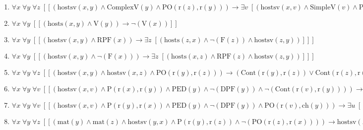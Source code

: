 \documentclass{article}
\begin{document}
\begin{enumerate}
\item $\forall x\; \forall y\; \forall z\;  \left[ \left[ \left(\textrm{hostsv}(x,y) \land \textrm{ComplexV}(y) \land \textrm{PO}(\textrm{r}(z),\textrm{r}(y))\right) \rightarrow \exists v\;  \left[ \left(\textrm{hostsv}(x,v) \land \textrm{SimpleV}(v) \land \textrm{PO}(\textrm{r}(z),\textrm{r}(v))\right) \right] \right] \right]$
\item $\forall x\; \forall y\;  \left[ \left[ \left(\textrm{hosts}(x,y) \land \textrm{V}(y)\right) \rightarrow \neg \left(\textrm{V}(x)\right) \right] \right]$
\item $\forall x\; \forall y\;  \left[ \left[ \left(\textrm{hostsv}(x,y) \land \textrm{RPF}(x)\right) \rightarrow \exists z\;  \left[ \left(\textrm{hosts}(z,x) \land \neg \left(\textrm{F}(z)\right) \land \textrm{hostsv}(z,y)\right) \right] \right] \right]$
\item $\forall x\; \forall y\;  \left[ \left[ \left(\textrm{hostsv}(x,y) \land \neg \left(\textrm{F}(x)\right)\right) \rightarrow \exists z\;  \left[ \left(\textrm{hosts}(x,z) \land \textrm{RPF}(z) \land \textrm{hostsv}(z,y)\right) \right] \right] \right]$
\item $\forall x\; \forall y\; \forall z\;  \left[ \left[ \left(\textrm{hostsv}(x,y) \land \textrm{hostsv}(x,z) \land \textrm{PO}(\textrm{r}(y),\textrm{r}(z))\right) \rightarrow \left(\textrm{Cont}(\textrm{r}(y),\textrm{r}(z)) \lor \textrm{Cont}(\textrm{r}(z),\textrm{r}(y))\right) \right] \right]$
\item $\forall x\; \forall y\; \forall v\;  \left[ \left[ \left(\textrm{hostsv}(x,v) \land \textrm{P}(\textrm{r}(x),\textrm{r}(y)) \land \textrm{PED}(y) \land \neg \left(\textrm{DPF}(y)\right) \land \neg \left(\textrm{Cont}(\textrm{r}(v),\textrm{r}(y))\right)\right) \rightarrow \exists u\;  \left[ \left(\textrm{Cont}(\textrm{difference}(\textrm{r}(v),\textrm{r}(y)),\textrm{r}(u)) \land \textrm{hostsv}(y,u)\right) \right] \right] \right]$
\item $\forall x\; \forall y\; \forall v\;  \left[ \left[ \left(\textrm{hostsv}(x,v) \land \textrm{P}(\textrm{r}(y),\textrm{r}(x)) \land \textrm{PED}(y) \land \neg \left(\textrm{DPF}(y)\right) \land \textrm{PO}(\textrm{r}(v),\textrm{ch}(y))\right) \rightarrow \exists u\;  \left[ \left(\textrm{=}(\textrm{r}(u),\textrm{intersection}(\textrm{r}(v),\textrm{ch}(y))) \land \textrm{hostsv}(y,u)\right) \right] \right] \right]$
\item $\forall x\; \forall y\; \forall z\;  \left[ \left[ \left(\textrm{mat}(y) \land \textrm{mat}(z) \land \textrm{hostsv}(y,x) \land \textrm{P}(\textrm{r}(y),\textrm{r}(z)) \land \neg \left(\textrm{PO}(\textrm{r}(z),\textrm{r}(x))\right)\right) \rightarrow \textrm{hostsv}(z,x) \right] \right]$

\end{enumerate}
\end{document}
